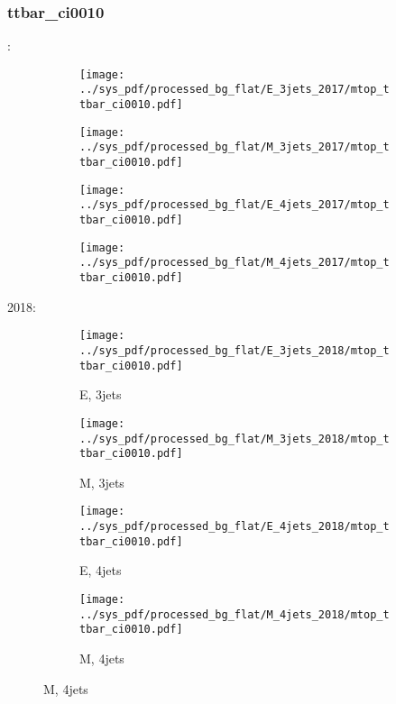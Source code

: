 \documentclass{beamer}
\begin{document}
\begin{frame}
\frametitle{ttbar_ci0010}
\fontsize{5}{1}:
\begin{figure}
\centering
\begin{subfigure}[b]{0.24\textwidth}
\texttt{[image: ../sys\_pdf/processed\_bg\_flat/E\_3jets\_2017/mtop\_ttbar\_ci0010.pdf]}
\end{subfigure}
\begin{subfigure}[b]{0.24\textwidth}
\texttt{[image: ../sys\_pdf/processed\_bg\_flat/M\_3jets\_2017/mtop\_ttbar\_ci0010.pdf]}
\end{subfigure}
\begin{subfigure}[b]{0.24\textwidth}
\texttt{[image: ../sys\_pdf/processed\_bg\_flat/E\_4jets\_2017/mtop\_ttbar\_ci0010.pdf]}
\end{subfigure}
\begin{subfigure}[b]{0.24\textwidth}
\texttt{[image: ../sys\_pdf/processed\_bg\_flat/M\_4jets\_2017/mtop\_ttbar\_ci0010.pdf]}
\end{subfigure}
\end{figure}
2018:
\begin{figure}
\centering
\begin{subfigure}[b]{0.24\textwidth}
\texttt{[image: ../sys\_pdf/processed\_bg\_flat/E\_3jets\_2018/mtop\_ttbar\_ci0010.pdf]}
\captionsetup{font=tiny}
\caption{E, 3jets}
\end{subfigure}
\begin{subfigure}[b]{0.24\textwidth}
\texttt{[image: ../sys\_pdf/processed\_bg\_flat/M\_3jets\_2018/mtop\_ttbar\_ci0010.pdf]}
\captionsetup{font=tiny}
\caption{M, 3jets}
\end{subfigure}
\begin{subfigure}[b]{0.24\textwidth}
\texttt{[image: ../sys\_pdf/processed\_bg\_flat/E\_4jets\_2018/mtop\_ttbar\_ci0010.pdf]}
\captionsetup{font=tiny}
\caption{E, 4jets}
\end{subfigure}
\begin{subfigure}[b]{0.24\textwidth}
\texttt{[image: ../sys\_pdf/processed\_bg\_flat/M\_4jets\_2018/mtop\_ttbar\_ci0010.pdf]}
\captionsetup{font=tiny}
\caption{M, 4jets}
\end{subfigure}
\end{figure}
\end{frame}
\end{document}
